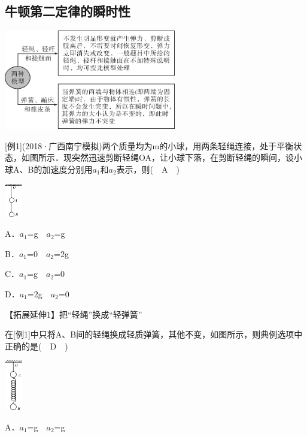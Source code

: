 \subsection{牛顿第二定律的瞬时性}

\begin{center}\includegraphics[width=2.95833in,height=1.70833in]{media/image100.png}\end{center}

{[}例1{]}(2018·广西南宁模拟)两个质量均为m的小球，用两条轻绳连接，处于平衡状态，如图所示．现突然迅速剪断轻绳OA，让小球下落，在剪断轻绳的瞬间，设小球A、B的加速度分别用$a_1$和$a_2$表示，则(　A　)

\begin{center}\includegraphics[width=0.3in]{media/image101.png}
	
\end{center}

A．$a_1$=g　$a_2$=g

B．$a_1$=0　$a_2$=2g

C．$a_1$=g　$a_2$=0

D．$a_1$=2g　$a_2$=0

【拓展延伸1】把``轻绳''换成``轻弹簧''

在{[}例1{]}中只将A、B间的轻绳换成轻质弹簧，其他不变，如图所示，则典例选项中正确的是(　D　)

\begin{center}\includegraphics[width=0.3in]{media/image102.png}
	
\end{center}

A．$a_1$=g　$a_2$=g

